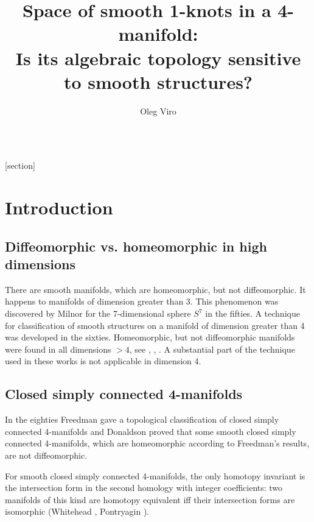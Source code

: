 \documentclass{article}
\begin{document}
$\newcommand\Fitt{\operatorname{Fitt}}
\newcommand{\Z}{\mathbb Z}
\newcommand{\p}{\partial}
\newcommand{\inj}{\operatorname{in}}
\newcommand{\codim}{\operatorname{codim}}
\newcommand{\sminus}{\smallsetminus}$ 

[section]{\bf}{\it}



\title{Space of smooth 1-knots in a 4-manifold:\\ Is its algebraic topology
sensitive to smooth structures?}
\author{Oleg Viro}
\date{}
\maketitle

\section{Introduction}\label{s1}
\subsection*{ Diffeomorphic vs. homeomorphic in high dimensions}
There are smooth manifolds, which are homeomorphic, but not diffeomorphic.
It happens to manifolds of dimension greater than 3. 
This phenomenon was discovered by Milnor \cite{Mi1} for the 7-dimensional
sphere $S^7$ in the fifties. A technique for classification of 
smooth 
structures on a manifold of dimension greater than 4 was developed in the 
sixties. 
Homeomorphic, but not diffeomorphic manifolds were found in all 
dimensions $>4$, see \cite{KM}, \cite{Ba}, \cite{S}. 
A substantial part of the technique used in these works is not 
applicable in dimension 4. \smallskip


\subsection*{Closed simply connected 4-manifolds} 
In the eighties Freedman \cite{F} gave a topological classification 
of closed simply connected 4-manifolds and Donaldson \cite{D} proved that 
some smooth closed simply connected 4-manifolds, which are homeomorphic 
according to Freedman's results, are not diffeomorphic. 

For smooth closed simply connected 4-manifolds, the only 
homotopy invariant
is the intersection form in the second homology with integer coefficients:
two manifolds of this kind are homotopy equivalent iff their intersection
forms are isomorphic (Whitehead \cite{Wh}, Pontryagin \cite{Po}). 
\end{document}
